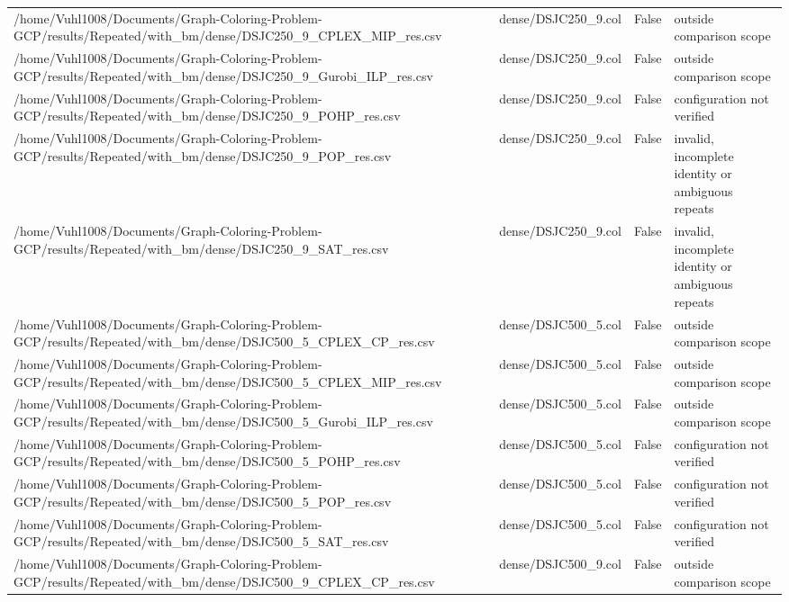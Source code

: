 \begin{table}[htbp]
\begin{tabular}{llll}
/home/Vuhl1008/Documents/Graph-Coloring-Problem-GCP/results/Repeated/with\_bm/dense/DSJC250\_9\_CPLEX\_MIP\_res.csv & dense/DSJC250\_9.col & False & outside comparison scope \\
/home/Vuhl1008/Documents/Graph-Coloring-Problem-GCP/results/Repeated/with\_bm/dense/DSJC250\_9\_Gurobi\_ILP\_res.csv & dense/DSJC250\_9.col & False & outside comparison scope \\
/home/Vuhl1008/Documents/Graph-Coloring-Problem-GCP/results/Repeated/with\_bm/dense/DSJC250\_9\_POHP\_res.csv & dense/DSJC250\_9.col & False & configuration not verified \\
/home/Vuhl1008/Documents/Graph-Coloring-Problem-GCP/results/Repeated/with\_bm/dense/DSJC250\_9\_POP\_res.csv & dense/DSJC250\_9.col & False & invalid, incomplete identity or ambiguous repeats \\
/home/Vuhl1008/Documents/Graph-Coloring-Problem-GCP/results/Repeated/with\_bm/dense/DSJC250\_9\_SAT\_res.csv & dense/DSJC250\_9.col & False & invalid, incomplete identity or ambiguous repeats \\
/home/Vuhl1008/Documents/Graph-Coloring-Problem-GCP/results/Repeated/with\_bm/dense/DSJC500\_5\_CPLEX\_CP\_res.csv & dense/DSJC500\_5.col & False & outside comparison scope \\
/home/Vuhl1008/Documents/Graph-Coloring-Problem-GCP/results/Repeated/with\_bm/dense/DSJC500\_5\_CPLEX\_MIP\_res.csv & dense/DSJC500\_5.col & False & outside comparison scope \\
/home/Vuhl1008/Documents/Graph-Coloring-Problem-GCP/results/Repeated/with\_bm/dense/DSJC500\_5\_Gurobi\_ILP\_res.csv & dense/DSJC500\_5.col & False & outside comparison scope \\
/home/Vuhl1008/Documents/Graph-Coloring-Problem-GCP/results/Repeated/with\_bm/dense/DSJC500\_5\_POHP\_res.csv & dense/DSJC500\_5.col & False & configuration not verified \\
/home/Vuhl1008/Documents/Graph-Coloring-Problem-GCP/results/Repeated/with\_bm/dense/DSJC500\_5\_POP\_res.csv & dense/DSJC500\_5.col & False & configuration not verified \\
/home/Vuhl1008/Documents/Graph-Coloring-Problem-GCP/results/Repeated/with\_bm/dense/DSJC500\_5\_SAT\_res.csv & dense/DSJC500\_5.col & False & configuration not verified \\
/home/Vuhl1008/Documents/Graph-Coloring-Problem-GCP/results/Repeated/with\_bm/dense/DSJC500\_9\_CPLEX\_CP\_res.csv & dense/DSJC500\_9.col & False & outside comparison scope \\

\end{tabular}
\end{table}
